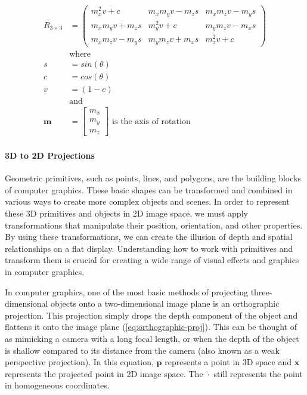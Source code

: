 \begin{equation}
    \begin{aligned}
        R_{3 \times 3} &= \begin{pmatrix}
            m_x^2v + c & m_xm_yv - m_zs & m_x m_z v - m_y s \\ m_x m_y v + m_z s & m_y^2 v + c & m_y m_z v - m_x s \\ m_x m_z v - m_y s & m_y m_z v + m_x s & m_z^2 v + c
        \end{pmatrix}\\
        &\text{where} \\
        s &= sin(\theta)\\
        c &= cos(\theta) \\
        v &= (1 - c) \\
        &\text{and}\\
        \mathbf{m} &= \begin{bmatrix}
            m_x \\ m_y \\ m_z
        \end{bmatrix} \text{ is the axis of rotation}
    \end{aligned}
    \label{eq:axis-angle-matrix}
\end{equation}



\paragraph*{3D to 2D Projections}
Geometric primitives, such as points, lines, and polygons, are the building blocks of computer graphics. These basic shapes can be transformed and combined in various ways to create more complex objects and scenes. In order to represent these 3D primitives and objects in 2D image space, we must apply transformations that manipulate their position, orientation, and other properties. By using these transformations, we can create the illusion of depth and spatial relationships on a flat display. Understanding how to work with primitives and transform them is crucial for creating a wide range of visual effects and graphics in computer graphics.

In computer graphics, one of the most basic methods of projecting three-dimensional objects onto a two-dimensional image plane is an orthographic projection. This projection simply drops the depth component of the object and flattens it onto the image plane (\cref{eq:orthographic-proj}). This can be thought of as mimicking a camera with a long focal length, or when the depth of the object is shallow compared to its distance from the camera (also known as a weak perspective projection). In this equation, $\mathbf{p}$ represents a point in 3D space and $\mathbf{x}$ represents the projected point in 2D image space. The $\tilde{\cdot}$ still represents the point in homogeneous coordinates.

